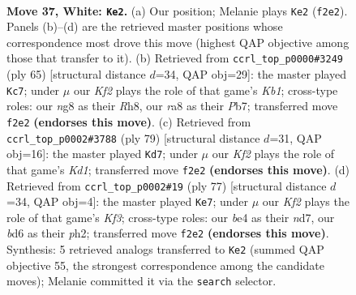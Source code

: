 \documentclass[11pt]{article}
\begin{document}
\clearpage

\begin{figure}[p]\centering
\begin{subfigure}{0.46\textwidth}\centering
\resizebox{\linewidth}{!}{%
\newchessgame
\chessboard[
  setfen={r1k3n1/3n4/3b4/6p1/4b2p/7P/1p3KP1/6R1 w - - 0 37},
  showmover=false,
  pgfstyle=straightmove, color=movearrow, markmove={f2-e2}
]}
\caption{}
\end{subfigure}\hfill
\begin{subfigure}{0.46\textwidth}\centering
\resizebox{\linewidth}{!}{%
\newchessgame
\chessboard[
  setfen={1k5r/1p3p2/4p3/4P3/2B1bP2/P7/2P5/2KR4 b - - 0 33},
  showmover=false,
  pgfstyle=straightmove, color=movearrow, markmove={b8-c7}
]}
\caption{}
\end{subfigure}
\\[4pt]
\begin{subfigure}{0.46\textwidth}\centering
\resizebox{\linewidth}{!}{%
\newchessgame
\chessboard[
  setfen={3k4/1p6/p2P3n/8/1P2B3/r7/7P/5R1K b - - 4 40},
  showmover=false,
  pgfstyle=straightmove, color=movearrow, markmove={d8-d7}
]}
\caption{}
\end{subfigure}\hfill
\begin{subfigure}{0.46\textwidth}\centering
\resizebox{\linewidth}{!}{%
\newchessgame
\chessboard[
  setfen={8/1p1N4/r4k1p/6p1/1n2P3/6P1/7P/3R2K1 b - - 3 39},
  showmover=false,
  pgfstyle=straightmove, color=movearrow, markmove={f6-e7}
]}
\caption{}
\end{subfigure}
\caption{\textbf{Move 37, White: \texttt{Ke2}.} (a) Our position; Melanie plays \texttt{Ke2} (\texttt{f2e2}). Panels (b)--(d) are the retrieved master positions whose correspondence most drove this move (highest QAP objective among those that transfer to it). (b) Retrieved from \texttt{ccrl\_top\_p0000\#3249} (ply 65) [structural distance $d$=34, QAP obj=29]: the master played \texttt{Kc7}; under $\mu$ our \emph{Kf2} plays the role of that game's \emph{Kb1}; cross-type roles: our \emph{n}g8 as their \emph{R}h8, our \emph{r}a8 as their \emph{P}b7; transferred move \texttt{f2e2} \textbf{(endorses this move)}. (c) Retrieved from \texttt{ccrl\_top\_p0002\#3788} (ply 79) [structural distance $d$=31, QAP obj=16]: the master played \texttt{Kd7}; under $\mu$ our \emph{Kf2} plays the role of that game's \emph{Kd1}; transferred move \texttt{f2e2} \textbf{(endorses this move)}. (d) Retrieved from \texttt{ccrl\_top\_p0002\#19} (ply 77) [structural distance $d$=34, QAP obj=4]: the master played \texttt{Ke7}; under $\mu$ our \emph{Kf2} plays the role of that game's \emph{Kf3}; cross-type roles: our \emph{b}e4 as their \emph{n}d7, our \emph{b}d6 as their \emph{p}h2; transferred move \texttt{f2e2} \textbf{(endorses this move)}. Synthesis: 5 retrieved analogs transferred to \texttt{Ke2} (summed QAP objective 55, the strongest correspondence among the candidate moves); Melanie committed it via the \texttt{search} selector.}
\label{fig:thought-m72}
\end{figure}
\end{document}
